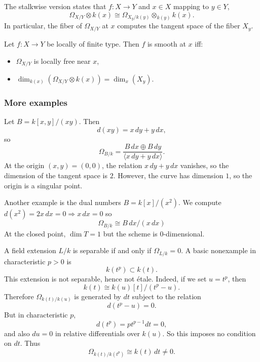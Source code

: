 \documentclass[12pt]{article}
\begin{document}
The stalkwise version states that $f:X \to Y$ and $x \in X$ mapping to $y \in Y$,
\[
    \Omega_{X/Y} \otimes k(x) \cong \Omega_{X_y/k(y)} \otimes_{k(y)} k(x).
\] In particular, the fiber of $\Omega_{X/Y}$ at $x$ computes the tangent space of the fiber $X_y$.

\begin{theorem}
    Let $f:X \to Y$ be locally of finite type. Then $f$ is smooth at $x$ iff:
    \begin{itemize}
        \item $\Omega_{X/Y}$ is locally free near $x$,
        \item $\dim_{k(x)}(\Omega_{X/Y} \otimes k(x)) = \dim_x(X_y)$.
    \end{itemize}
\end{theorem}

\subsubsection{More examples}

\begin{example}
    Let $B = k[x,y]/(xy)$. Then
    \[
        d(xy) = x\,dy + y\,dx,
    \]
    so
    \[
        \Omega_{B/k} = \frac{B\,dx \oplus B\,dy}{\langle x\,dy + y\,dx \rangle}.
    \]
    At the origin $(x,y) = (0,0)$, the relation $x\,dy + y\,dx$ vanishes, so the dimension of the tangent space is $2$. However, the curve has dimension $1$, so the origin is a singular point.
\end{example}

\begin{example}
    Another example is the dual numbers $B = k[x]/(x^2)$. We compute $d(x^2) = 2x\,dx = 0 \Rightarrow x\,dx=0$ so
    \[
        \Omega_{B/k} \cong B\,dx / (x\,dx)
    \]
    At the closed point, $\dim T = 1$ but the scheme is $0$-dimensional.
\end{example}

\begin{example}
    A field extension $L/k$ is separable if and only if $\Omega_{L/k}=0$. A basic nonexample in characteristic $p>0$ is
    \[
        k(t^p)\subset k(t).
    \]
    This extension is not separable, hence not étale. Indeed, if we set $u=t^p$, then
    \[
        k(t)\cong k(u)[t]/(t^p-u).
    \]
    Therefore $\Omega_{k(t)/k(u)}$
    is generated by $dt$ subject to the relation
    \[
        d(t^p-u)=0.
    \]
    But in characteristic $p$,
    \[
        d(t^p)=p t^{p-1}dt=0,
    \]
    and also $du=0$ in relative differentials over $k(u)$. So this imposes no condition on $dt$. Thus
    \[
        \Omega_{k(t)/k(t^p)}\cong k(t)\,dt\neq 0.
    \]
\end{example}
\end{document}
